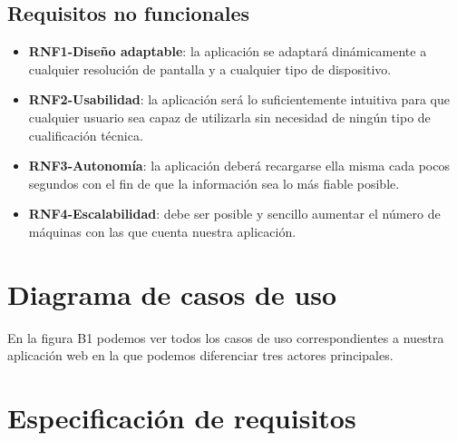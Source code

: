 \subsection{Requisitos no funcionales}

\begin{itemize}
\item \textbf{RNF1-Diseño adaptable}: la aplicación se adaptará dinámicamente a cualquier resolución de pantalla y a cualquier tipo de dispositivo.
\item \textbf{RNF2-Usabilidad}: la aplicación será lo suficientemente intuitiva para que cualquier usuario sea capaz de utilizarla sin necesidad de ningún tipo de cualificación técnica.
\item \textbf{RNF3-Autonomía}: la aplicación deberá recargarse ella misma cada pocos segundos con el fin de que la información sea lo más fiable posible.
\item \textbf{RNF4-Escalabilidad}: debe ser posible y sencillo aumentar el número de máquinas con las que cuenta nuestra aplicación.

\end{itemize}
\section{Diagrama de casos de uso}

En la figura B1 podemos ver todos los casos de uso correspondientes a nuestra aplicación web en la que podemos diferenciar tres actores principales.


\break

\newpage

\section{Especificación de requisitos}

